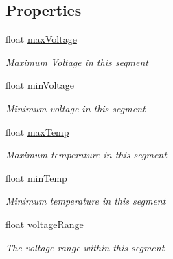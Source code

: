 \subsection*{Properties}
\begin{DoxyCompactItemize}
\item 
float \hyperlink{class_accumulator_monitor_m017_1_1_backend_1_1_data_frame_a424a2aec4d15a992d31024d6e16ebb51}{max\+Voltage}
\begin{DoxyCompactList}\small\item\em Maximum Voltage in this segment \end{DoxyCompactList}\item 
float \hyperlink{class_accumulator_monitor_m017_1_1_backend_1_1_data_frame_ae2f7d167459a4adbcb45c29d53648f8f}{min\+Voltage}
\begin{DoxyCompactList}\small\item\em Minimum voltage in this segment \end{DoxyCompactList}\item 
float \hyperlink{class_accumulator_monitor_m017_1_1_backend_1_1_data_frame_af589b31836fc8f36f661244ca1310773}{max\+Temp}
\begin{DoxyCompactList}\small\item\em Maximum temperature in this segment \end{DoxyCompactList}\item 
float \hyperlink{class_accumulator_monitor_m017_1_1_backend_1_1_data_frame_ad4ec44cca9cbbdf2457c271e6b833f06}{min\+Temp}
\begin{DoxyCompactList}\small\item\em Minimum temperature in this segment \end{DoxyCompactList}\item 
float \hyperlink{class_accumulator_monitor_m017_1_1_backend_1_1_data_frame_a93abdfffbbc9910bfba61222e6889366}{voltage\+Range}
\begin{DoxyCompactList}\small\item\em The voltage range within this segment \end{DoxyCompactList}\end{DoxyCompactItemize}


